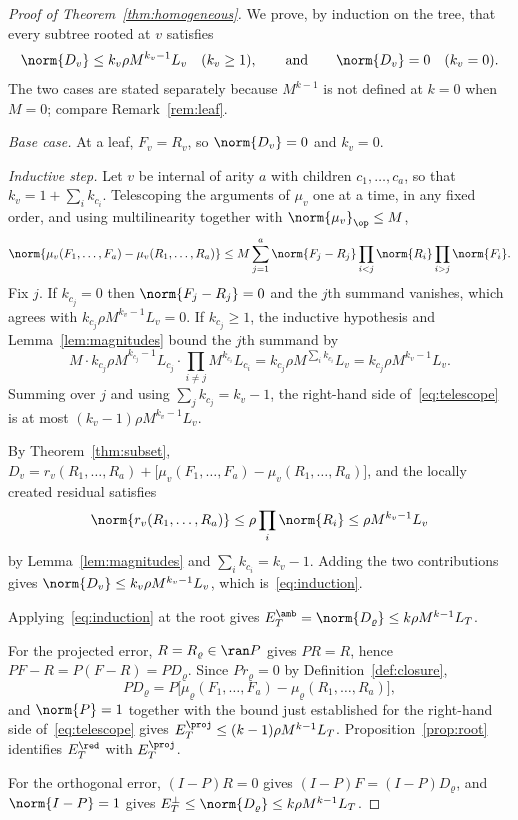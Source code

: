 \begin{proof}[Proof of Theorem~\ref{thm:homogeneous}]
We prove, by induction on the tree, that every subtree rooted at $v$ satisfies
\begin{equation}
\label{eq:induction}
 \norm{D_v}\le k_v\rho M^{k_v-1}L_v
 \quad (k_v\ge1),
 \qquad\text{and}\qquad
 \norm{D_v}=0
 \quad (k_v=0).
\end{equation}
The two cases are stated separately because $M^{k-1}$ is not defined at $k=0$ when $M=0$;
compare Remark~\ref{rem:leaf}.

\emph{Base case.} At a leaf, $F_v=R_v$, so $\norm{D_v}=0$ and $k_v=0$.

\emph{Inductive step.} Let $v$ be internal of arity $a$ with children $c_1,\ldots,c_a$,
so that $k_v=1+\sum_ik_{c_i}$. Telescoping the arguments of $\mu_v$ one at a time, in any
fixed order, and using multilinearity together with $\norm{\mu_v}_\op\le M$,
\begin{equation}
\label{eq:telescope}
 \norm{\mu_v(F_1,\ldots,F_a)-\mu_v(R_1,\ldots,R_a)}
 \le M\sum_{j=1}^{a}\norm{F_j-R_j}\prod_{i<j}\norm{R_i}\prod_{i>j}\norm{F_i}.
\end{equation}
Fix $j$. If $k_{c_j}=0$ then $\norm{F_j-R_j}=0$ and the $j$th summand vanishes, which
agrees with $k_{c_j}\rho M^{k_v-1}L_v=0$. If $k_{c_j}\ge1$, the inductive hypothesis and
Lemma~\ref{lem:magnitudes} bound the $j$th summand by
\[
 M\cdot k_{c_j}\rho M^{k_{c_j}-1}L_{c_j}\cdot\prod_{i\ne j}M^{k_{c_i}}L_{c_i}
 =k_{c_j}\rho M^{\sum_ik_{c_i}}L_v
 =k_{c_j}\rho M^{k_v-1}L_v.
\]
Summing over $j$ and using $\sum_jk_{c_j}=k_v-1$, the right-hand side
of~\eqref{eq:telescope} is at most $(k_v-1)\rho M^{k_v-1}L_v$.

By Theorem~\ref{thm:subset},
$D_v=r_v(R_1,\ldots,R_a)+\bigl[\mu_v(F_1,\ldots,F_a)-\mu_v(R_1,\ldots,R_a)\bigr]$, and
the locally created residual satisfies
\[
 \norm{r_v(R_1,\ldots,R_a)}
 \le\rho\prod_i\norm{R_i}
 \le\rho M^{k_v-1}L_v
\]
by Lemma~\ref{lem:magnitudes} and $\sum_ik_{c_i}=k_v-1$. Adding the two contributions
gives $\norm{D_v}\le k_v\rho M^{k_v-1}L_v$, which is~\eqref{eq:induction}.

Applying~\eqref{eq:induction} at the root gives
$E_T^{\amb}=\norm{D_\varrho}\le k\rho M^{k-1}L_T$.

For the projected error, $R=R_\varrho\in\ran P$ gives $PR=R$, hence
$PF-R=P(F-R)=PD_\varrho$. Since $Pr_\varrho=0$ by Definition~\ref{def:closure},
\[
 PD_\varrho
 =P\bigl[\mu_\varrho(F_1,\ldots,F_a)-\mu_\varrho(R_1,\ldots,R_a)\bigr],
\]
and $\norm{P}=1$ together with the bound just established for the right-hand side
of~\eqref{eq:telescope} gives $E_T^{\proj}\le(k-1)\rho M^{k-1}L_T$.
Proposition~\ref{prop:root} identifies $E_T^{\red}$ with $E_T^{\proj}$.

For the orthogonal error, $(I-P)R=0$ gives $(I-P)F=(I-P)D_\varrho$, and $\norm{I-P}=1$
gives $E_T^{\perp}\le\norm{D_\varrho}\le k\rho M^{k-1}L_T$.
\end{proof}

